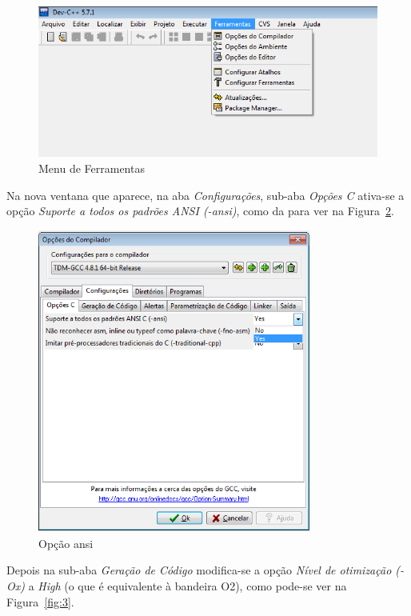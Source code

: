 \documentclass[12pt, a4paper]{article}
\begin{document}
\begin{figure}[H]
  \centering
  \includegraphics[width=140mm]{Imagens/1.png}
  \caption{Menu de Ferramentas}
\label{fig:1}
\end{figure}

Na nova ventana que aparece, na aba \emph{Configurações}, sub-aba \emph{Opções C} ativa-se a opção \emph{Suporte a todos os padrões ANSI (-ansi)}, como da para ver na Figura~\ref{fig:2}.

\begin{figure}[H]
  \centering
  \includegraphics[width=90mm]{Imagens/2.png}
  \caption{Opção ansi}
\label{fig:2}
\end{figure}

Depois na sub-aba \emph{Geração de Código} modifica-se a opção \emph{Nível de otimização (-Ox)} a \emph{High} (o que é equivalente à bandeira O2), como pode-se ver na Figura~\ref{fig:3}.
\end{document}
